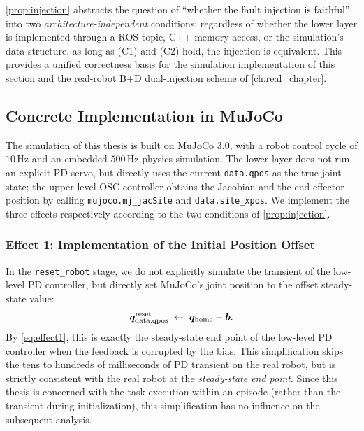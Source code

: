 \cref{prop:injection} abstracts the question of ``whether the fault injection is faithful'' into two \emph{architecture-independent} conditions: regardless of whether the lower layer is implemented through a ROS topic, C++ memory access, or the simulation's data structure, as long as (C1) and (C2) hold, the injection is equivalent. This provides a unified correctness basis for the simulation implementation of this section and the real-robot B+D dual-injection scheme of \cref{ch:real_chapter}.

\subsection{Concrete Implementation in MuJoCo}\label{subsec:sim_implementation}

The simulation of this thesis is built on MuJoCo 3.0, with a robot control cycle of $10$\,Hz and an embedded $500$\,Hz physics simulation. The lower layer does not run an explicit PD servo, but directly uses the current \texttt{data.qpos} as the true joint state; the upper-level OSC controller obtains the Jacobian and the end-effector position by calling \texttt{mujoco.mj\_jacSite} and \texttt{data.site\_xpos}. We implement the three effects respectively according to the two conditions of \cref{prop:injection}.

\subsubsection*{Effect 1: Implementation of the Initial Position Offset}\label{subsec:sim_effect1}

In the \texttt{reset\_robot} stage, we do not explicitly simulate the transient of the low-level PD controller, but directly set MuJoCo's joint position to the offset steady-state value:
\begin{equation}
  \bm{q}_{\text{data.qpos}}^{\text{reset}} \;\leftarrow\; \bm{q}_{\text{home}} - \bm{b}.
  \label{eq:sim_reset}
\end{equation}
By \cref{eq:effect1}, this is exactly the steady-state end point of the low-level PD controller when the feedback is corrupted by the bias. This simplification skips the tens to hundreds of milliseconds of PD transient on the real robot, but is strictly consistent with the real robot at the \emph{steady-state end point}. Since this thesis is concerned with the task execution within an episode (rather than the transient during initialization), this simplification has no influence on the subsequent analysis.

